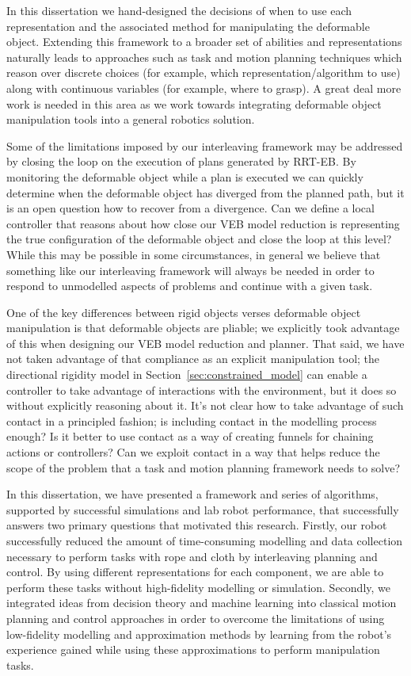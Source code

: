 In this dissertation we hand-designed the decisions of when to use each representation and the associated method for manipulating the deformable object. Extending this framework to a broader set of abilities and representations naturally leads to approaches such as task and motion planning techniques which reason over discrete choices (for example, which representation/algorithm to use) along with continuous variables (for example, where to grasp). A great deal more work is needed in this area as we work towards integrating deformable object manipulation tools into a general robotics solution.

Some of the limitations imposed by our interleaving framework may be addressed by closing the loop on the execution of plans generated by RRT-EB. By monitoring the deformable object while a plan is executed we can quickly determine when the deformable object has diverged from the planned path, but it is an open question how to recover from a divergence. Can we define a local controller that reasons about how close our VEB model reduction is representing the true configuration of the deformable object and close the loop at this level? While this may be possible in some circumstances, in general we believe that something like our interleaving framework will always be needed in order to respond to unmodelled aspects of problems and continue with a given task.

One of the key differences between rigid objects verses deformable object manipulation is that deformable objects are pliable; we explicitly took advantage of this when designing our VEB model reduction and planner. That said, we have not taken advantage of that compliance as an explicit manipulation tool; the directional rigidity model in Section~\ref{sec:constrained_model} can enable a controller to take advantage of interactions with the environment, but it does so without explicitly reasoning about it. It's not clear how to take advantage of such contact in a principled fashion; is including contact in the modelling process enough? Is it better to use contact as a way of creating funnels for chaining actions or controllers? Can we exploit contact in a way that helps reduce the scope of the problem that a task and motion planning framework needs to solve?

In this dissertation, we have presented a framework and series of algorithms, supported by successful simulations and lab robot performance, that successfully answers two primary questions that motivated this research. Firstly, our robot successfully reduced the amount of time-consuming modelling and data collection necessary to perform tasks with rope and cloth by interleaving planning and control. By using different representations for each component, we are able to perform these tasks without high-fidelity modelling or simulation. Secondly, we integrated ideas from decision theory and machine learning into classical motion planning and control approaches in order to overcome the limitations of using low-fidelity modelling and approximation methods by learning from the robot's experience gained while using these approximations to perform manipulation tasks.

